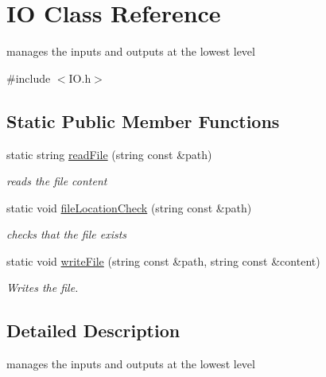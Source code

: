 \hypertarget{class_i_o}{\section{\-I\-O \-Class \-Reference}
\label{class_i_o}
}


manages the inputs and outputs at the lowest level  




{\ttfamily \#include $<$\-I\-O.\-h$>$}

\subsection*{\-Static \-Public \-Member \-Functions}
\begin{DoxyCompactItemize}
\item 
static string \hyperlink{class_i_o_acbbc2e87b0f74fc22c3ae5c52c833b66}{read\-File} (string const \&path)
\begin{DoxyCompactList}\small\item\em reads the file content \end{DoxyCompactList}\item 
static void \hyperlink{class_i_o_a52fa8b4ba4fd422c92e5e555ea038e26}{file\-Location\-Check} (string const \&path)
\begin{DoxyCompactList}\small\item\em checks that the file exists \end{DoxyCompactList}\item 
\hypertarget{class_i_o_a2baa8c97d82ca6bf9e31d27832a6f68c}{static void \hyperlink{class_i_o_a2baa8c97d82ca6bf9e31d27832a6f68c}{write\-File} (string const \&path, string const \&content)}\label{class_i_o_a2baa8c97d82ca6bf9e31d27832a6f68c}

\begin{DoxyCompactList}\small\item\em \-Writes the file. \end{DoxyCompactList}\end{DoxyCompactItemize}


\subsection{\-Detailed \-Description}
manages the inputs and outputs at the lowest level 

